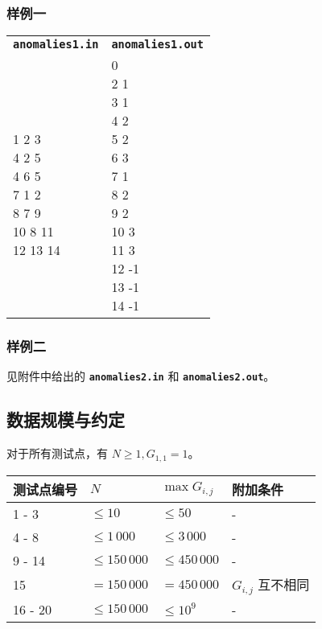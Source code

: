 \documentclass[UTF8, 11pt, a4paper]{article}
\begin{document}
\subsubsection*{样例一}
\begin{table}[h]\centering
\begin{tabularx}{0.8 \textwidth}{|X|X|}
\hline
\texttt{\textbf{anomalies1.in}} & \texttt{\textbf{anomalies1.out}} \\ \hline
{\ttfamily
7\newline
1 2 3\newline
4 2 5\newline
4 6 5\newline
7 1 2\newline
8 7 9\newline
10 8 11\newline
12 13 14
} & {\ttfamily
1 0\newline
2 1\newline
3 1\newline
4 2\newline
5 2\newline
6 3\newline
7 1\newline
8 2\newline
9 2\newline
10 3\newline
11 3\newline
12 -1\newline
13 -1\newline
14 -1
}
\\ \hline
\end{tabularx}\end{table}

\subsubsection*{样例二}
见附件中给出的 \texttt{\textbf{anomalies2.in}} 和 \texttt{\textbf{anomalies2.out}}。

\subsection*{数据规模与约定}
对于所有测试点，有 $N \geq 1, G_{1, 1} = 1$。

\begin{table}[h]\centering
\begin{tabularx}{0.85 \textwidth}{X|X|X|X} \hline
测试点编号 & $N$             & $\max{G_{i,j}}$ & 附加条件 \\ \hline\hline
1 - 3      & $\leq 10$       & $\leq 50$       & - \\ \hline
4 - 8      & $\leq 1\,000$   & $\leq 3\,000$   & - \\ \hline
9 - 14     & $\leq 150\,000$ & $\leq 450\,000$ & - \\ \hline
15         & $= 150\,000$    & $= 450\,000$    & $G_{i,j}$ 互不相同 \\ \hline
16 - 20    & $\leq 150\,000$ & $\leq 10^9$     & - \\ \hline
\end{tabularx}
\end{table}
\newpage
\end{document}
